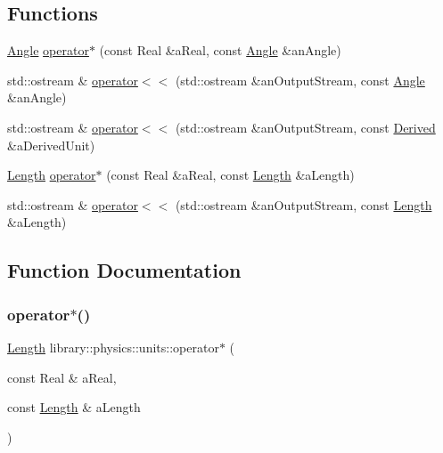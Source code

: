 \subsection*{Functions}
\begin{DoxyCompactItemize}
\item 
\hyperlink{classlibrary_1_1physics_1_1units_1_1_angle}{Angle} \hyperlink{namespacelibrary_1_1physics_1_1units_ac89514ddad142e1c8c6d67f0f7708b6b}{operator$\ast$} (const Real \&a\+Real, const \hyperlink{classlibrary_1_1physics_1_1units_1_1_angle}{Angle} \&an\+Angle)
\item 
std\+::ostream \& \hyperlink{namespacelibrary_1_1physics_1_1units_ae0f25add792e8ea9705789fb8587ec1b}{operator$<$$<$} (std\+::ostream \&an\+Output\+Stream, const \hyperlink{classlibrary_1_1physics_1_1units_1_1_angle}{Angle} \&an\+Angle)
\item 
std\+::ostream \& \hyperlink{namespacelibrary_1_1physics_1_1units_ae5fe5e8cca7d4b7bb172e0919e7173dc}{operator$<$$<$} (std\+::ostream \&an\+Output\+Stream, const \hyperlink{classlibrary_1_1physics_1_1units_1_1_derived}{Derived} \&a\+Derived\+Unit)
\item 
\hyperlink{classlibrary_1_1physics_1_1units_1_1_length}{Length} \hyperlink{namespacelibrary_1_1physics_1_1units_a00ff20791c9a7001f44dbb68a849b36d}{operator$\ast$} (const Real \&a\+Real, const \hyperlink{classlibrary_1_1physics_1_1units_1_1_length}{Length} \&a\+Length)
\item 
std\+::ostream \& \hyperlink{namespacelibrary_1_1physics_1_1units_a09416cc4b0022c4fbb1bd8c8306d5eab}{operator$<$$<$} (std\+::ostream \&an\+Output\+Stream, const \hyperlink{classlibrary_1_1physics_1_1units_1_1_length}{Length} \&a\+Length)
\end{DoxyCompactItemize}


\subsection{Function Documentation}
\mbox{\label{namespacelibrary_1_1physics_1_1units_a00ff20791c9a7001f44dbb68a849b36d}} 
\subsubsection{\texorpdfstring{operator$\ast$()}{operator*()}\hspace{0.1cm}{\footnotesize\ttfamily [1/2]}}
{\footnotesize\ttfamily \hyperlink{classlibrary_1_1physics_1_1units_1_1_length}{Length} library\+::physics\+::units\+::operator$\ast$ (\begin{DoxyParamCaption}\item[{const Real \&}]{a\+Real,  }\item[{const \hyperlink{classlibrary_1_1physics_1_1units_1_1_length}{Length} \&}]{a\+Length }\end{DoxyParamCaption})}

